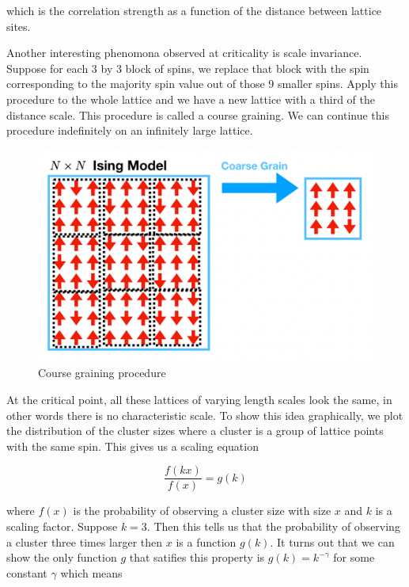 \documentclass{article}
\begin{document}
which is the correlation strength as a function of the distance between lattice sites.

Another interesting phenomona observed at criticality is scale invariance. Suppose for each 3 by 3 block of spins, we replace that block
with the spin corresponding to the majority spin value out of those 9 smaller spins. Apply this procedure to the whole lattice and we have
a new lattice with a third of the distance scale. This procedure is called a course graining. We can continue this procedure indefinitely on an 
infinitely large lattice.

\begin{figure}[ht]
    \includegraphics[width=\columnwidth]{diagrams/course_grain.png}
    \caption{Course graining procedure}
    \label{fig:6}
\end{figure}

At the critical point, all these lattices of varying length scales look the same, in other words there is no 
characteristic scale. To show this idea graphically, we plot the distribution of the cluster sizes where a cluster is a group of lattice points with
the same spin. This gives us a scaling equation 



\begin{equation}
    \frac{f(kx)}{f(x)} = g(k)
\end{equation}

where $f(x)$ is the probability of observing a cluster size with size $x$ and $k$ is a scaling factor.
Suppose $k=3$. Then this tells us that the probability of observing a cluster three times larger then $x$
is a function $g(k)$. It turns out that we can show the only function $g$ that satifies this property is
$g(k) = k^{-\gamma}$ for some constant $\gamma$ which means
\end{document}
